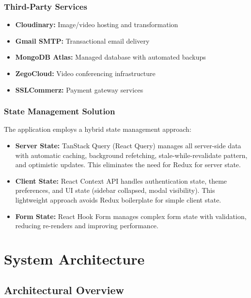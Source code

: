\documentclass[12pt,a4paper]{article}
\begin{document}
\subsubsection{Third-Party Services}
\begin{itemize}[noitemsep]
  \item \textbf{Cloudinary:} Image/video hosting and transformation
  \item \textbf{Gmail SMTP:} Transactional email delivery
  \item \textbf{MongoDB Atlas:} Managed database with automated backups
  \item \textbf{ZegoCloud:} Video conferencing infrastructure
  \item \textbf{SSLCommerz:} Payment gateway services
\end{itemize}

\subsubsection{State Management Solution}

The application employs a hybrid state management approach:

\begin{itemize}[noitemsep]
  \item \textbf{Server State:} TanStack Query (React Query) manages all server-side data with automatic caching, background refetching, stale-while-revalidate pattern, and optimistic updates. This eliminates the need for Redux for server state.
  \item \textbf{Client State:} React Context API handles authentication state, theme preferences, and UI state (sidebar collapsed, modal visibility). This lightweight approach avoids Redux boilerplate for simple client state.
  \item \textbf{Form State:} React Hook Form manages complex form state with validation, reducing re-renders and improving performance.
\end{itemize}

\clearpage
\section{System Architecture}

\subsection{Architectural Overview}
\end{document}
